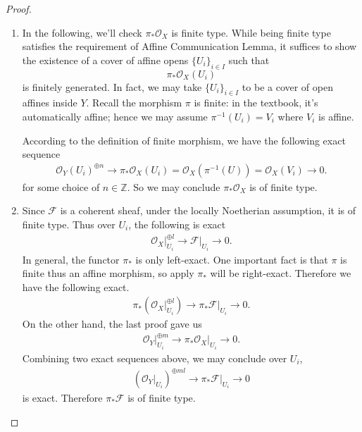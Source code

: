 \begin{proof}
    \begin{enumerate}
    \item In the following, we'll check $\pi_{\ast}\mathscr O_X$ is finite type.
    While being finite type satisfies the requirement of Affine Communication Lemma, it suffices to show the existence of a cover of affine opens $\{U_i\}_{i\in I}$ such that 
    \[\pi_{\ast}\mathscr O_X(U_i)\] is finitely generated. In fact, we may take $\{U_i\}_{i\in I}$ to be a cover of open affines inside $Y$. Recall the morphism $\pi$ is finite: in the textbook, it's automatically affine; hence we may assume $\pi^{-1}(U_i)=V_i$ where $V_i$ is affine. 

    According to the definition of finite morphism, we have the following exact sequence
    \begin{align}
        \mathscr O_Y(U_i)^{\oplus n} \to \pi_{\ast}\mathscr O_X(U_i)=\mathscr O_X(\pi^{-1}(U))=\mathscr O_X(V_i)\to 0.
    \end{align}for some choice of $n\in\mathbb Z$.
    So we may conclude $\pi_{\ast}\mathscr O_X$ is of finite type. 

    \item Since $\mathscr F$ is a coherent sheaf, under the locally Noetherian assumption, it is of finite type. Thus over $U_i$, the following is exact
    \begin{align}
        \mathscr O_X\vert_{U_i}^{\oplus l}\to \mathscr F\vert_{U_i}\to 0.
    \end{align}
    In general, the functor $\pi_{\ast}$ is only left-exact.
    One important fact is that $\pi$ is finite thus an affine morphism, so apply $\pi_{\ast}$ will be right-exact. Therefore we have the following exact.
    \begin{align}\label{14.4.D.1}
        \pi_{\ast}(\mathscr O_X\vert_{U_i}^{\oplus l})\to \pi_{\ast}\mathscr F\vert_{U_i}\to 0.
    \end{align}
    On the other hand, the last proof gave us 
    \begin{align}\label{14.4.D.2}
        \mathscr O_Y\vert_{U_i}^{\oplus m}\to \pi_{\ast}\mathscr O_X\vert_{U_i}\to 0.
    \end{align}
    Combining two exact sequences above, we may conclude over $U_i$, 
    \begin{align}
        (\mathscr O_Y\vert_{U_i})^{\oplus ml}\to \pi_{\ast}\mathscr F\vert_{U_i}\to 0
    \end{align} is exact. Therefore $\pi_{\ast}\mathscr F$ is of finite type.
    \end{enumerate}
\end{proof}

